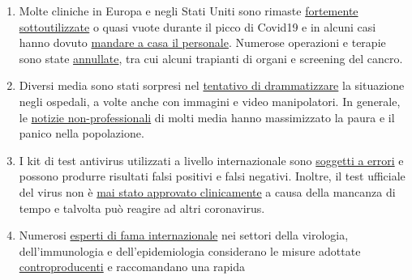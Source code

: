 \begin{enumerate}
{  scientifiche} dell'efficacia delle mascherine in soggetti sani o
  asintomatici. Al contrario, gli esperti avvertono che tali mascherine
  interferiscono con la normale respirazione e possono diventare
  ``\href{https://de.sputniknews.com/interviews/20200425326953541-corona-gefahr-virologe/}{portatori
  di germi}``. I principali dottori le hanno definite un ``clamore
  mediatico'' e
  ``\href{https://www.aerztezeitung.de/Politik/Montgomery-haelt-Maskenpflicht-fuer-falsch-408844.html}{ridicole}``.
\item
  Molte cliniche in Europa e negli Stati Uniti sono rimaste
  \href{https://www.hsj.co.uk/acute-care/nhs-hospitals-have-four-times-more-empty-beds-than-normal/7027392.article}{fortemente
  sottoutilizzate} o quasi vuote durante il picco di Covid19 e in alcuni
  casi hanno dovuto
  \href{https://www.usatoday.com/story/news/health/2020/04/02/coronavirus-pandemic-jobs-us-health-care-workers-furloughed-laid-off/5102320002/}{mandare
  a casa il personale}. Numerose operazioni e terapie sono state
  \href{https://www.sfchronicle.com/bayarea/article/Stanford-hospital-system-to-cut-pay-20-furlough-15227591.php}{annullate},
  tra cui alcuni trapianti di organi e screening del cancro.
\item
  Diversi media sono stati sorpresi nel
  \href{https://nypost.com/2020/04/01/cbs-admits-to-using-footage-from-italy-in-report-about-nyc/}{tentativo
  di drammatizzare} la situazione negli ospedali, a volte anche con
  immagini e video manipolatori. In generale, le
  \href{https://onlinelibrary.wiley.com/doi/full/10.1111/eci.13222}{notizie
  non-professionali} di molti media hanno massimizzato la paura e il
  panico nella popolazione.
\item
  I kit di test antivirus utilizzati a livello internazionale sono
  \href{https://www.ncbi.nlm.nih.gov/pubmed/32219885}{soggetti a errori}
  e possono produrre risultati falsi positivi e falsi negativi. Inoltre,
  il test ufficiale del virus non è
  \href{https://www.youtube.com/watch?v=p_AyuhbnPOI}{mai stato approvato
  clinicamente} a causa della mancanza di tempo e talvolta può reagire
  ad altri coronavirus.
\item
  Numerosi
  \href{https://off-guardian.org/2020/03/24/12-experts-questioning-the-coronavirus-panic/}{esperti
  di fama internazionale} nei settori della virologia, dell'immunologia
  e dell'epidemiologia considerano le misure adottate
  \href{https://off-guardian.org/2020/03/28/10-more-experts-criticising-the-coronavirus-panic/}{controproducenti}
  e raccomandano una rapida

\end{enumerate}
